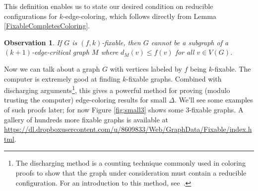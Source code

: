 \documentclass[12pt]{article}
\theoremstyle{plain}
\newtheorem{obs}[observation]{Observation}
\theoremstyle{definition}
\theoremstyle{remark}
\begin{document}
This definition enables us to state our desired condition on reducible configurations for
$k$-edge-coloring, which follows directly from Lemma \ref{FixableCompletesColoring}. 
\begin{obs}
If $G$ is $(f,k)$-fixable, then $G$ cannot be a subgraph of a
$(k+1)$-edge-critical graph $M$ where $d_M(v) \le f(v)$ for all $v \in V(G)$.  
\end{obs}
Now we can talk about a graph $G$ with vertices labeled by $f$ being
$k$-fixable.  The computer is extremely good at finding $k$-fixable
graphs.  Combined with discharging arguments\footnote{The discharging method is
a counting technique commonly used in coloring proofs to show that the graph
under consideration must contain a reducible configuration. For an introduction
to this method,
see~\cite{discharging13}.}, this gives a powerful method for proving (modulo
trusting the computer) edge-coloring results for small $\Delta$.  We'll see
some examples of such proofs later; for now Figure \ref{fig:small3} shows some
$3$-fixable graphs.  A gallery of hundreds more fixable graphs is available at
\url{https://dl.dropboxusercontent.com/u/8609833/Web/GraphData/Fixable/index.html}.
\end{document}
